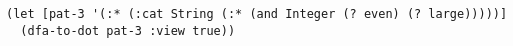 \begin{lstlisting}[style=reclojureClojure]
(let [pat-3 '(:* (:cat String (:* (and Integer (? even) (? large)))))]
  (dfa-to-dot pat-3 :view true))
\end{lstlisting}
